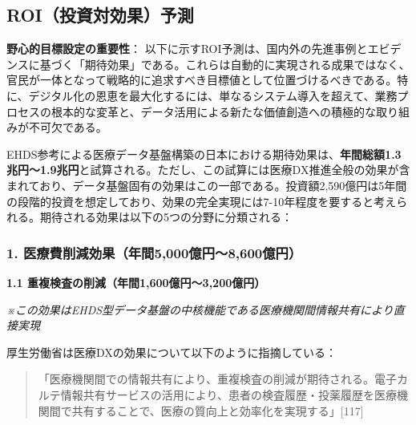 \documentclass[
  a4paper,
  a4paper,
  11pt]{ltjsbook}
\begin{document}
\subsection{ROI（投資対効果）予測}\label{roiux6295ux8cc7ux5bfeux52b9ux679cux4e88ux6e2c}

\begin{tcolorbox}[enhanced jigsaw, toprule=.15mm, bottomtitle=1mm, coltitle=black, left=2mm, opacityback=0, arc=.35mm, colbacktitle=quarto-callout-warning-color!10!white, colback=white, opacitybacktitle=0.6, bottomrule=.15mm, rightrule=.15mm, breakable, title=\textcolor{quarto-callout-warning-color}{\faExclamationTriangle}\hspace{0.5em}{Warning}, toptitle=1mm, titlerule=0mm, colframe=quarto-callout-warning-color-frame, leftrule=.75mm]

\textbf{野心的目標設定の重要性}：
以下に示すROI予測は、国内外の先進事例とエビデンスに基づく「期待効果」である。これらは自動的に実現される成果ではなく、官民が一体となって戦略的に追求すべき目標値として位置づけるべきである。特に、デジタル化の恩恵を最大化するには、単なるシステム導入を超えて、業務プロセスの根本的な変革と、データ活用による新たな価値創造への積極的な取り組みが不可欠である。

\end{tcolorbox}

EHDS参考による医療データ基盤構築の日本における期待効果は、\textbf{年間総額1.3兆円〜1.9兆円}と試算される。ただし、この試算には医療DX推進全般の効果が含まれており、データ基盤固有の効果はこの一部である。投資額2,590億円は5年間の段階的投資を想定しており、効果の完全実現には7-10年程度を要すると考えられる。期待される効果は以下の5つの分野に分類される：

\subsubsection{1.
医療費削減効果（年間5,000億円〜8,600億円）}\label{ux533bux7642ux8cbbux524aux6e1bux52b9ux679cux5e74ux95935000ux5104ux51868600ux5104ux5186}

\textbf{1.1 重複検査の削減（年間1,600億円〜3,200億円）}

\emph{※この効果はEHDS型データ基盤の中核機能である医療機関間情報共有により直接実現}

厚生労働省は医療DXの効果について以下のように指摘している：

\begin{quote}
「医療機関間での情報共有により、重複検査の削減が期待される。電子カルテ情報共有サービスの活用により、患者の検査履歴・投薬履歴を医療機関間で共有することで、医療の質向上と効率化を実現する」{[}117{]}
\end{quote}
\end{document}
